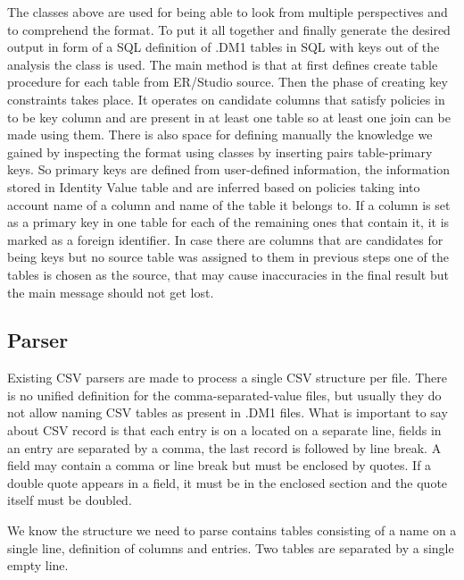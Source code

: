 The classes above are used for being able to look from multiple perspectives and to comprehend the format.
To put it all together and finally generate the desired output in form of a SQL definition of .DM1 tables in SQL with keys out of the analysis the class  is used.
The main method is  that at first defines create table procedure for each table from ER/Studio source. 
Then the phase of creating key constraints takes place. It operates on candidate columns that satisfy policies in  to be key column and are present in at least one table so at least one join can be made using them.
There is also space for defining manually the knowledge we gained by inspecting the format using  classes by inserting pairs table-primary keys.
So primary keys are defined from user-defined information, the information stored in Identity Value table and are inferred based on policies taking into account name of a column and name of the table it belongs to.
If a column is set as a primary key in one table for each of the remaining ones that contain it, it is marked as a foreign identifier.
In case there are columns that are candidates for being keys but no source table was assigned to them in previous steps one of the tables is chosen as the source, that may cause inaccuracies in the final result but the main message should not get lost.

\subsection{Parser}
\label{subsec:dm1_parser}

Existing CSV parsers are made to process a single CSV structure per file. There is no unified definition for the comma-separated-value files, but usually they do not allow naming CSV tables as present in .DM1 files.
What is important to say about CSV record is that each entry is on a located on a separate line, fields in an entry are separated by a comma, the last record is followed by line break. A field may contain a comma or line break but must be enclosed by quotes. 
If a double quote appears in a field, it must be in the enclosed section and the quote itself must be doubled. \cite{RfcCSV}

We know the structure we need to parse contains tables consisting of a name on a single line, definition of columns and entries. Two tables are separated by a single empty line.

